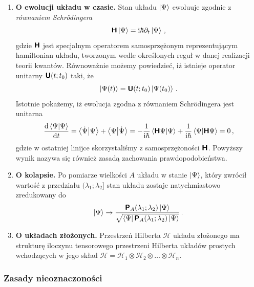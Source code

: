 \documentclass{myclass}
\begin{document}
\begin{enumerate}[label=\Roman*.]
    \item \textbf{O ewolucji układu w czasie.} Stan układu \(\ket{\Psi}\) ewoluuje zgodnie z
    \textit{równaniem Schr\"{o}dingera}
    \begin{equation*}
        \boldsymbol{\mathsf{H}}\ket{\Psi} = \mathrm{i}\hbar\partial_t\ket{\Psi}\,,
    \end{equation*}
    gdzie \(\boldsymbol{\mathsf{H}}\) jest specjalnym operatorem samosprzężonym reprezentującym hamiltonian układu,
    tworzonym wedle określonych reguł w danej realizacji teorii kwantów. Równoważnie możemy
    powiedzieć, iż istnieje operator unitarny \(\boldsymbol{\mathsf{U}}(t;t_0)\) taki, że
    \begin{equation*}
        \ket{\Psi(t)} = \boldsymbol{\mathsf{U}}(t;t_0)\ket{\Psi(t_0)}\,.
    \end{equation*}
    Istotnie pokażemy, iż ewolucja zgodna z równaniem Schr\"{o}dingera jest unitarna
    \begin{equation*}
        \dv{\braket{\Psi}}{t} = \braket{\dot{\Psi}}{\Psi} + \braket{\Psi}{\dot{\Psi}} = -\frac{1}{\mathrm{i}\hbar}\bra{\boldsymbol{\mathsf{H}}\Psi}\ket{\Psi} + \frac{1}{\mathrm{i}\hbar}\bra{\Psi}\ket{\boldsymbol{\mathsf{H}}\Psi} = 0\,,
    \end{equation*}
    gdzie w ostatniej linijce skorzystaliśmy z samosprzężoności \(\boldsymbol{\mathsf{H}}\). Powyższy wynik nazywa
    się również zasadą zachowania prawdopodobieństwa.

    \item \textbf{O kolapsie.} Po pomiarze wielkości \(A\) układu w stanie \(\ket{\Psi}\), który
    zwrócił wartość z przedziału \((\lambda_1;\lambda_2]\) stan układu zostaje natychmiastowo
    zredukowany do
    \begin{equation*}
        \ket{\Psi} \to \frac{\boldsymbol{\mathsf{P}}_A(\lambda_1;\lambda_2)\ket{\Psi}}{\sqrt{\bra{\Psi}\boldsymbol{\mathsf{P}}_A(\lambda_1;\lambda_2)\ket{\Psi}}}\,.
    \end{equation*}

    \item \textbf{O układach złożonych.} Przestrzeń Hilberta \(\mathscr{H}\) układu złożonego ma
    strukturę iloczynu tensorowego przestrzeni Hilberta układów prostych wchodzących w jego skład
    \(\mathscr{H}=\mathscr{H}_1\otimes\mathscr{H}_2\otimes\ldots\otimes\mathscr{H}_n\).

\end{enumerate}

\subsubsection*{Zasady nieoznaczoności}
\end{document}
